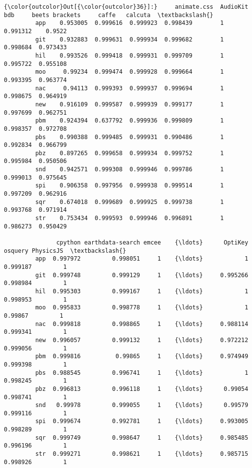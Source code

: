 \documentclass[11pt]{article}
\begin{document}
\begin{Verbatim}[commandchars=\\\{\}]
{\color{outcolor}Out[{\color{outcolor}36}]:}     animate.css  AudioKit       bdb     beets brackets     caffe   calcuta  \textbackslash{}
         app    0.953005  0.999616  0.999923  0.998439        1  0.991312    0.9522   
         git    0.932883  0.999631  0.999934  0.999682        1  0.998684  0.973433   
         hil    0.993526  0.999418  0.999931  0.999709        1  0.995722  0.955108   
         moo     0.99234  0.999474  0.999928  0.999664        1  0.993395  0.963774   
         nac     0.94113  0.999393  0.999937  0.999694        1  0.998675  0.964919   
         new    0.916109  0.999587  0.999939  0.999177        1  0.997699  0.962751   
         pbm    0.924394  0.637792  0.999936  0.999809        1  0.998357  0.972708   
         pbs    0.990388  0.999485  0.999931  0.990486        1  0.992834  0.966799   
         pbz    0.897265  0.999658  0.999934  0.999752        1  0.995984  0.950506   
         snd    0.942571  0.999308  0.999946  0.999786        1  0.999013  0.975645   
         spi    0.906358  0.997956  0.999938  0.999514        1  0.997209  0.962916   
         sqr    0.674018  0.999689  0.999925  0.999738        1  0.993768  0.971914   
         str    0.753434  0.999593  0.999946  0.996891        1  0.986273  0.950429   
         
               cpython earthdata-search emcee    {\ldots}      OptiKey   osquery PhysicsJS  \textbackslash{}
         app  0.997972         0.998051     1    {\ldots}            1  0.999187         1   
         git  0.999748         0.999129     1    {\ldots}     0.995266  0.998984         1   
         hil  0.995303         0.999167     1    {\ldots}            1  0.998953         1   
         moo  0.995833         0.998778     1    {\ldots}            1   0.99867         1   
         nac  0.999818         0.998865     1    {\ldots}     0.988114  0.999341         1   
         new  0.996057         0.999132     1    {\ldots}     0.972212  0.999056         1   
         pbm  0.999816          0.99865     1    {\ldots}     0.974949  0.999398         1   
         pbs  0.988545         0.996741     1    {\ldots}            1  0.998245         1   
         pbz  0.996813         0.996118     1    {\ldots}      0.99054  0.998741         1   
         snd   0.99978         0.999055     1    {\ldots}      0.99579  0.999116         1   
         spi  0.999674         0.992781     1    {\ldots}     0.993005  0.998289         1   
         sqr  0.999749         0.998647     1    {\ldots}     0.985485  0.996196         1   
         str  0.999271         0.998621     1    {\ldots}     0.985715  0.998926         1   
         

\end{Verbatim}
\end{document}
